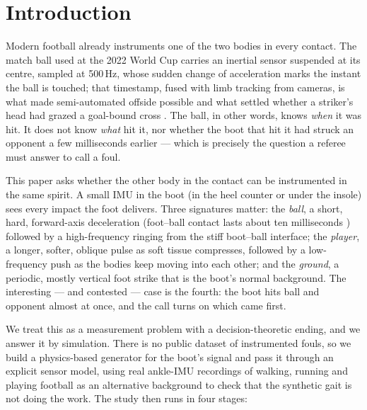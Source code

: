 \section{Introduction}
\label{sec:intro}

Modern football already instruments one of the two bodies in every contact.
The match ball used at the 2022 World Cup carries an inertial sensor suspended
at its centre, sampled at 500\,Hz, whose sudden change of acceleration marks
the instant the ball is touched; that timestamp, fused with limb tracking from
cameras, is what made semi-automated offside possible and what settled whether
a striker's head had grazed a goal-bound cross \cite{fifa2022connected}. The
ball, in other words, knows \emph{when} it was hit. It does not know
\emph{what} hit it, nor whether the boot that hit it had struck an opponent a
few milliseconds earlier --- which is precisely the question a referee must
answer to call a foul.

This paper asks whether the other body in the contact can be instrumented in
the same spirit. A small IMU in the boot (in the heel counter or under the
insole) sees every impact the foot delivers. Three signatures matter: the
\emph{ball}, a short, hard, forward-axis deceleration (foot--ball contact lasts
about ten milliseconds \cite{nunome2006impact}) followed by a high-frequency
ringing from the stiff boot--ball interface; the \emph{player}, a longer,
softer, oblique pulse as soft tissue compresses, followed by a low-frequency
push as the bodies keep moving into each other; and the \emph{ground}, a
periodic, mostly vertical foot strike that is the boot's normal background.
The interesting --- and contested --- case is the fourth: the boot hits ball and
opponent almost at once, and the call turns on which came first.

We treat this as a measurement problem with a decision-theoretic ending, and
we answer it by simulation. There is no public dataset of instrumented fouls,
so we build a physics-based generator for the boot's signal and pass it through
an explicit sensor model, using real ankle-IMU recordings of walking, running
and playing football \cite{reiss2012introducing} as an alternative background
to check that the synthetic gait is not doing the work. The study then runs in
four stages:

